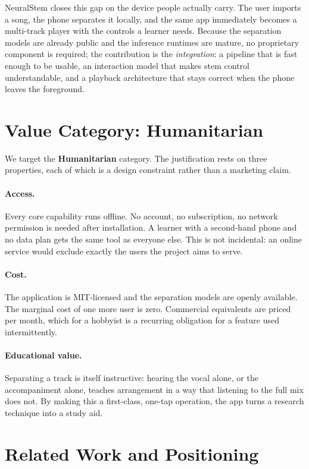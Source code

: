 \documentclass[letterpaper]{article} %
\begin{document}
NeuralStem closes this gap on the device people actually carry. The user
imports a song, the phone separates it locally, and the same app immediately
becomes a multi-track player with the controls a learner needs. Because the
separation models are already public and the inference runtimes are mature, no
proprietary component is required; the contribution is the \emph{integration}:
a pipeline that is fast enough to be usable, an interaction model that makes
stem control understandable, and a playback architecture that stays correct
when the phone leaves the foreground.

\section{Value Category: Humanitarian}

We target the \textbf{Humanitarian} category. The justification rests on three
properties, each of which is a design constraint rather than a marketing claim.

\paragraph{Access.} Every core capability runs offline. No account, no
subscription, no network permission is needed after installation. A learner
with a second-hand phone and no data plan gets the same tool as everyone else.
This is not incidental: an online service would exclude exactly the users the
project aims to serve.

\paragraph{Cost.} The application is MIT-licensed and the separation models are
openly available. The marginal cost of one more user is zero. Commercial
equivalents are priced per month, which for a hobbyist is a recurring
obligation for a feature used intermittently.

\paragraph{Educational value.} Separating a track is itself instructive: hearing
the vocal alone, or the accompaniment alone, teaches arrangement in a way that
listening to the full mix does not. By making this a first-class, one-tap
operation, the app turns a research technique into a study aid.

\section{Related Work and Positioning}
\end{document}
